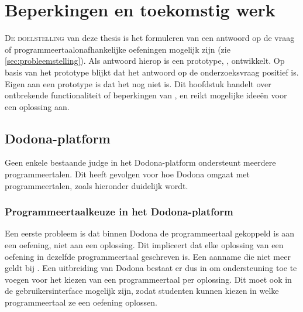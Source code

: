 \chapter{Beperkingen en toekomstig werk}\label{ch:beperkingen-en-toekomstig-werk}

\lettrine{D}{e doelstelling} van deze thesis is het formuleren van een antwoord op de vraag of programmeertaalonafhankelijke oefeningen mogelijk zijn (zie \cref{sec:probleemstelling}).
Als antwoord hierop is een prototype, \tested{}, ontwikkelt.
Op basis van het prototype blijkt dat het antwoord op de onderzoeksvraag positief is.
Eigen aan een prototype is dat het nog niet  is.
Dit hoofdstuk handelt over ontbrekende functionaliteit of beperkingen van \tested{}, en reikt mogelijke ideeën voor een oplossing aan.

\section{Dodona-platform}\label{sec:dodona-platform}

Geen enkele bestaande judge in het Dodona-platform ondersteunt meerdere programmeertalen.
Dit heeft gevolgen voor hoe Dodona omgaat met programmeertalen, zoals hieronder duidelijk wordt.

\subsection{Programmeertaalkeuze in het Dodona-platform}\label{subsec:programmeertaalkeuze-in-het-dodona-platform}

Een eerste probleem is dat binnen Dodona de programmeertaal gekoppeld is aan een oefening, niet aan een oplossing.
Dit impliceert dat elke oplossing van een oefening in dezelfde programmeertaal geschreven is.
Een aanname die niet meer geldt bij \tested{}.
Een uitbreiding van Dodona bestaat er dus in om ondersteuning toe te voegen voor het kiezen van een programmeertaal per oplossing.
Dit moet ook in de gebruikersinterface mogelijk zijn, zodat studenten kunnen kiezen in welke programmeertaal ze een oefening oplossen.

